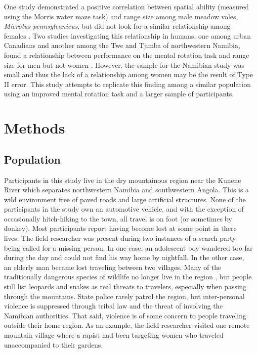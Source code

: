 One study demonstrated a positive correlation between spatial ability (measured using the Morris water maze task) and range size among male meadow voles, \emph{Microtus pennsylvanicus}, but did not look for a similar relationship among females \citep{spritzer2005influence}.  Two studies investigating this relationship in humans, one among urban Canadians and another among the Twe and Tjimba of northwestern Namibia, found a relationship between performance on the mental rotation task and range size for men but not women \citep{vashro2014spatial}.  However, the sample for the Namibian study was small and thus the lack of a relationship among women may be the result of Type II error.  This study attempts to replicate this finding among a similar population using an improved mental rotation task and a larger sample of participants. 

\section{Methods}
\label{sec:2}
	\subsection{Population}
Participants in this study live in the dry mountainous region near the Kunene River which separates northwestern Namibia and southwestern Angola.  This is a wild environment free of paved roads and large artificial structures.  None of the participants in the study own an automotive vehicle, and with the exception of occasionally hitch-hiking to the town, all travel is on foot (or sometimes by donkey).  Most participants report having become lost at some point in there lives.  The field researcher was present during two instances of a search party being called for a missing person.  In one case, an adolescent boy wandered too far during the day and could not find his way home by nightfall.  In the other case, an elderly man became lost traveling between two villages.  Many of the traditionally dangerous species of wildlife no longer live in the region \cite{viljoen1982distribution}, but people still list leopards and snakes as real threats to travelers, especially when passing through the mountains.  State police rarely patrol the region, but inter-personal violence is suppressed through tribal law and the threat of involving the Namibian authorities.  That said, violence is of some concern to people traveling outside their home region.  As an example, the field researcher visited one remote mountain village where a rapist had been targeting women who traveled unaccompanied to their gardens.

